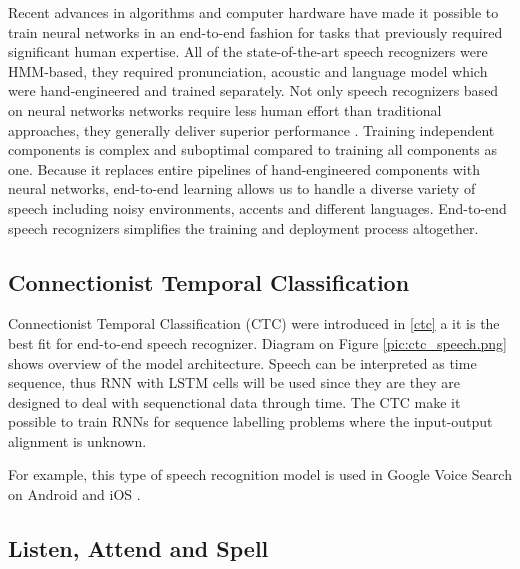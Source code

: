 Recent advances in algorithms and computer hardware have made it possible to train neural networks in an end-to-end fashion for tasks that previously required significant human expertise.
All of the state-of-the-art speech recognizers were HMM-based, they required pronunciation, acoustic and language model which were hand-engineered and trained separately.
Not only speech recognizers based on neural networks networks require less human effort than traditional approaches, they generally deliver superior performance \cite{end-to-end}.
Training independent components is complex and suboptimal compared to training all components as one.
Because it replaces entire pipelines of hand-engineered components with neural networks, end-to-end learning allows us to handle a diverse variety of speech including noisy environments, accents and different languages\cite{end-to-end-mandarin}.
End-to-end speech recognizers simplifies the training and deployment process altogether.

\subsection{Connectionist Temporal Classification}

Connectionist Temporal Classification (CTC) were introduced in \ref{ctc} a it is the best fit for end-to-end speech recognizer.
Diagram on Figure \ref{pic:ctc_speech.png} shows overview of the model architecture.
Speech can be interpreted as time sequence, thus RNN with LSTM cells will be used since they are they are designed to deal with sequenctional data through time.
The CTC make it possible to train RNNs for sequence labelling problems where the input-output alignment is unknown.


For example, this type of speech recognition model is used in Google Voice Search on Android and iOS \cite{google_search}.


\subsection{Listen, Attend and Spell}

